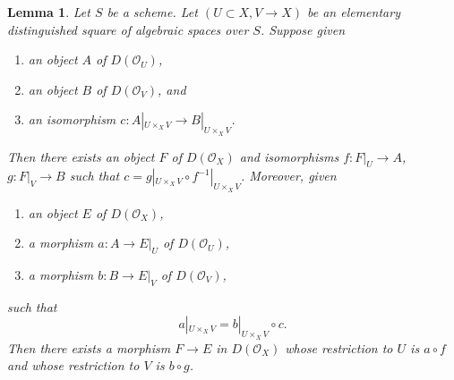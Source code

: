 \documentclass{amsart}
\theoremstyle{plain}
\newtheorem{lemma}[subsection]{Lemma}
\theoremstyle{definition}
\theoremstyle{remark}
\numberwithin{equation}{subsection}
\begin{document}
\begin{lemma}
\label{lemma-glue}
Let $S$ be a scheme. Let $(U \subset X, V \to X)$ be an elementary
distinguished square of algebraic spaces over $S$. Suppose given
\begin{enumerate}
\item an object $A$ of $D(\mathcal{O}_U)$,
\item an object $B$ of $D(\mathcal{O}_V)$, and
\item an isomorphism $c : A|_{U \times_X V} \to B|_{U \times_X V}$.
\end{enumerate}
Then there exists an object $F$ of $D(\mathcal{O}_X)$
and isomorphisms $f : F|_U \to A$, $g : F|_V \to B$ such
that $c = g|_{U \times_X V} \circ f^{-1}|_{U \times_X V}$.
Moreover, given
\begin{enumerate}
\item an object $E$ of $D(\mathcal{O}_X)$,
\item a morphism $a : A \to E|_U$ of $D(\mathcal{O}_U)$,
\item a morphism $b : B \to E|_V$ of $D(\mathcal{O}_V)$,
\end{enumerate}
such that
$$
a|_{U \times_X V}  = b|_{U \times_X V} \circ c.
$$
Then there exists a morphism $F \to E$ in $D(\mathcal{O}_X)$
whose restriction to $U$ is $a \circ f$
and whose restriction to $V$ is $b \circ g$.
\end{lemma}
\end{document}
